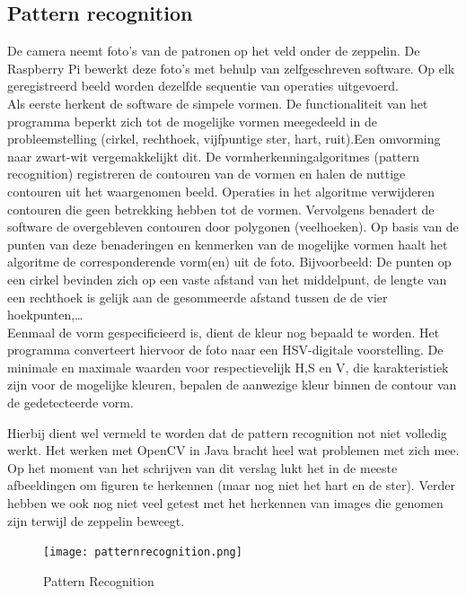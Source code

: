 \documentclass[tt]{penoverslag}
\begin{document}
\subsection{Pattern recognition}
De camera neemt foto’s van de patronen op het veld onder de zeppelin. De Raspberry Pi bewerkt deze foto’s met behulp van zelfgeschreven software. Op elk geregistreerd beeld worden dezelfde sequentie van operaties uitgevoerd. \\
Als eerste herkent de software de simpele vormen. De functionaliteit van het programma beperkt zich tot de mogelijke vormen meegedeeld in de probleemstelling (cirkel, rechthoek, vijfpuntige ster, hart, ruit).Een omvorming naar zwart-wit vergemakkelijkt dit. De vormherkenningalgoritmes (pattern recognition) registreren de contouren van de vormen en halen de nuttige contouren uit het waargenomen beeld. Operaties in het algoritme verwijderen contouren die geen betrekking hebben tot de vormen. Vervolgens benadert de software de overgebleven contouren door polygonen (veelhoeken). Op basis van de punten van deze benaderingen en kenmerken van de mogelijke vormen haalt het algoritme de corresponderende vorm(en) uit de foto. Bijvoorbeeld: De punten op een cirkel bevinden zich op een vaste afstand van het middelpunt, de lengte van een rechthoek is gelijk aan de gesommeerde afstand tussen de de vier hoekpunten,\ldots \\
Eenmaal de vorm gespecificieerd is, dient de kleur nog bepaald te worden.  Het programma converteert hiervoor de foto naar een HSV-digitale voorstelling. De minimale en maximale waarden voor respectievelijk H,S en V, die karakteristiek zijn voor de mogelijke kleuren, bepalen de aanwezige kleur binnen de contour van de gedetecteerde vorm. 

Hierbij dient wel vermeld te worden dat de pattern recognition not niet volledig werkt. Het werken met OpenCV in Java bracht heel wat problemen met zich mee. Op het moment van het schrijven van dit verslag lukt het in de meeste afbeeldingen om figuren te herkennen (maar nog niet het hart en de ster). Verder hebben we ook nog niet veel getest met het herkennen van images die genomen zijn terwijl de zeppelin beweegt.

\begin{figure}[H]
\begin{center}
\texttt{[image: patternrecognition.png]}
\end{center}
\caption{Pattern Recognition}
\label{Patterns}
\end{figure}
\end{document}
